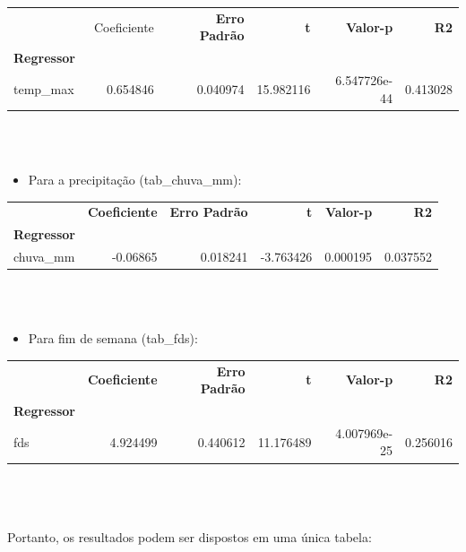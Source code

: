 \documentclass[a4paper, 12pt]{article}
\begin{document}
\begin{tabular}{lrrrrr}
\toprule
{} &  \ {Coeficiente} &  \textbf{Erro Padrão} &          \textbf{t} &       \textbf{Valor-p} &        \textbf{R2} \\
\textbf{Regressor} &              &              &            &               &           \\
\midrule
temp\_max  &     0.654846 &     0.040974 &  15.982116 &  6.547726e-44 &  0.413028 \\
\bottomrule
\end{tabular}\\ \\

\begin{itemize}
    \item Para a precipitação (tab\_chuva\_mm):
\end{itemize}


\begin{tabular}{lrrrrr}
\toprule
{} &  \textbf{Coeficiente} &  \textbf{Erro Padrão} &         \textbf{t} &   \textbf{Valor-p} &        \textbf{R2} \\
\textbf{Regressor} &              &              &           &           &           \\
\midrule
chuva\_mm  &     -0.06865 &     0.018241 & -3.763426 &  0.000195 &  0.037552 \\
\bottomrule
\end{tabular} \\ \\


\begin{itemize}
    \item Para fim de semana (tab\_fds):
\end{itemize}

\begin{tabular}{lrrrrr}
\toprule
{} &  \textbf{Coeficiente} & \textbf{ Erro Padrão} &          \textbf{t} &       \textbf{Valor-p} &        \textbf{R2} \\
\textbf{Regressor} &              &              &            &               &           \\
\midrule
fds       &     4.924499 &     0.440612 &  11.176489 &  4.007969e-25 &  0.256016 \\
\bottomrule
\end{tabular}\\ \\ \\

Portanto, os resultados podem ser dispostos em uma única tabela: \\
\end{document}
